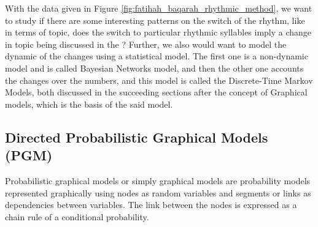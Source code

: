 With the data given in Figure \ref{fig:fatihah_baqarah_rhythmic_method}, we want to study if there are some interesting patterns on the switch of the rhythm, like in terms of topic, does the switch to particular rhythmic syllables imply a change in topic being discussed in the  ? Further, we also would want to model the dynamic of the changes using a statistical model. The first one is a non-dynamic model and is called Bayesian Networks model, and then the other one accounts the changes over the   numbers, and this model is called the Discrete-Time Markov Models, both discussed in the succeeding sections after the concept of Graphical models, which is the basis of the said model.
\subsection{Directed Probabilistic Graphical Models (PGM)}
Probabilistic graphical models or simply graphical models are probability models represented graphically using nodes as random variables and segments or links as dependencies between variables. The link between the nodes is expressed as a chain rule of a conditional probability.

